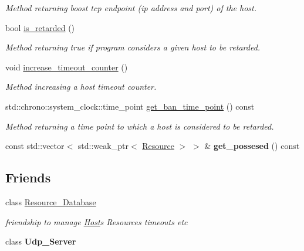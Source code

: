 \begin{DoxyCompactItemize}
\begin{DoxyCompactList}\small\item\em Method returning boost tcp endpoint (ip address and port) of the host. \end{DoxyCompactList}\item 
bool \hyperlink{classsimpleP2P_1_1Host_ace84648960b75e127112069be905357c}{is\+\_\+retarded} ()
\begin{DoxyCompactList}\small\item\em Method returning true if program considers a given host to be retarded. \end{DoxyCompactList}\item 
void \hyperlink{classsimpleP2P_1_1Host_afcd858f4c6a7496b6164e36a5192f1db}{increase\+\_\+timeout\+\_\+counter} ()
\begin{DoxyCompactList}\small\item\em Method increasing a host timeout counter. \end{DoxyCompactList}\item 
std\+::chrono\+::system\+\_\+clock\+::time\+\_\+point \hyperlink{classsimpleP2P_1_1Host_abfde4abb7dda157b1f589267b5facf05}{get\+\_\+ban\+\_\+time\+\_\+point} () const
\begin{DoxyCompactList}\small\item\em Method returning a time point to which a host is considered to be retarded. \end{DoxyCompactList}\item 
\mbox{\label{classsimpleP2P_1_1Host_a4f79059423a0a6e29320c38c7090aa3d}} 
const std\+::vector$<$ std\+::weak\+\_\+ptr$<$ \hyperlink{classsimpleP2P_1_1Resource}{Resource} $>$ $>$ \& {\bfseries get\+\_\+possesed} () const
\end{DoxyCompactItemize}
\subsection*{Friends}
\begin{DoxyCompactItemize}
\item 
\mbox{\label{classsimpleP2P_1_1Host_a8d5b8c31f7b51293954816c91b76cabd}} 
class \hyperlink{classsimpleP2P_1_1Host_a8d5b8c31f7b51293954816c91b76cabd}{Resource\+\_\+\+Database}
\begin{DoxyCompactList}\small\item\em friendship to manage \hyperlink{classsimpleP2P_1_1Host}{Host}\textquotesingle{}s Resources timeouts etc \end{DoxyCompactList}\item 
\mbox{\label{classsimpleP2P_1_1Host_a2e132a23686d06801caac963d4620259}} 
class {\bfseries Udp\+\_\+\+Server}
\end{DoxyCompactItemize}


